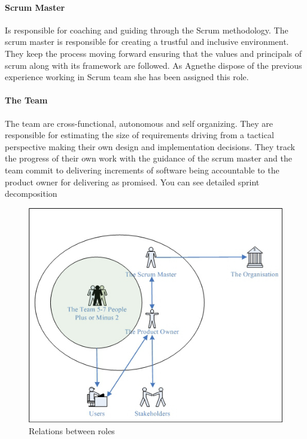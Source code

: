 \paragraph{Scrum Master}
Is responsible for coaching and guiding through the Scrum methodology. The scrum master is responsible for creating a trustful and inclusive environment. They keep the process moving forward ensuring that the values and principals of scrum along with its framework are followed. As Agnethe dispose of the previous experience working in Scrum team she has been assigned this role.

\paragraph{The Team}
The team are cross-functional, autonomous and self organizing.  They are responsible for estimating the size of requirements driving from a tactical perspective making their own design and implementation decisions. They track the progress of their own work with the guidance of the scrum master and the team commit to delivering increments of software  being accountable to the product owner for delivering as promised.
You can see detailed sprint decomposition 

\begin{figure}[h!]
    \begin{center}
    \includegraphics[width=15cm]{planning/roles.jpg}
    \caption{Relations between roles}
    \label{img:roles}
    \end{center}
\end{figure}

